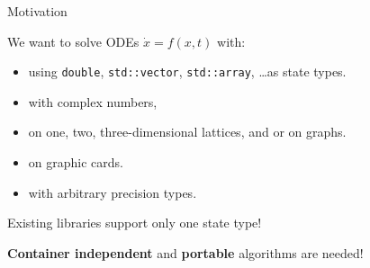 \documentclass{beamer}
\newcommand{\heading}[1]{\centerline{\Large #1} \vspace{0.5em}}
\begin{document}
\begin{frame}[fragile]
 \heading{Motivation}

 \vspace{2ex}

 We want to solve ODEs $\dot{x}=f(x,t)$ with:
 \begin{itemize}
  \item using  {\tt double}, {\tt std::vector}, {\tt std::array}, \dots as state types.
  \item with complex numbers,
  \item on one, two, three-dimensional lattices, and or on graphs.
  \item on graphic cards.
  \item with arbitrary precision types.
 \end{itemize}

 \vspace{2ex}

Existing libraries support only one state type!

\vspace{4ex}
\centerline{\textbf{Container independent} and {\bf portable} algorithms are needed!}

\end{frame}
\end{document}
